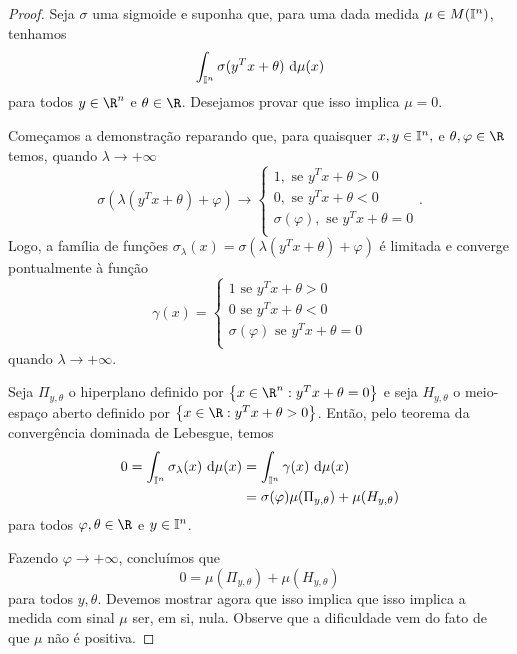 \begin{proof}
    Seja \( \sigma \) uma sigmoide e suponha que, para uma dada medida \( \mu \in M(\mathbb{I}^{ n }) \), tenhamos \[
        \int_{ \I^{ n } } \sigma(y^{ T }x + \theta) \ \mathrm{d}\mu(x)
    \]
    para todos \( y \in \R^{ n } \) e \( \theta \in \R \).
    Desejamos provar que isso implica \( \mu = 0 \).

    Começamos a demonstração reparando que, para quaisquer \( x, y \in \mathbb{I}^{ n },\) e \( \theta, \varphi \in \R \) temos, quando \( \lambda \to +\infty \) \[
        \sigma(\lambda(y^{ T }x + \theta) + \varphi)
        \to
        \begin{cases}
            1, \text{ se } y^{ T }x + \theta > 0 \\
            0, \text{ se } y^{ T }x + \theta < 0 \\
            \sigma(\varphi), \text{ se } y^{ T }x + \theta = 0 \\
        \end{cases}
    .\]
    Logo, a família de funções \( \sigma_{ \lambda }(x) = \sigma(\lambda(y^{ T }x + \theta) + \varphi) \) é limitada e converge pontualmente à função \[
        \gamma(x) =
        \begin{cases}
            1 \text{ se } y^{ T }x + \theta > 0 \\
            0 \text{ se } y^{ T }x + \theta < 0 \\
            \sigma(\varphi) \text{ se } y^{ T }x + \theta = 0 \\
        \end{cases}
    \]
    quando \( \lambda \to +\infty \).

    Seja \( \Pi_{ y, \theta } \) o hiperplano definido por \( \left\{ x \in \R^{ n } : y^{ T }x + \theta = 0 \right\} \) e seja \( H_{ y, \theta } \) o meio-espaço aberto definido por \( \left\{ x \in \R : y^{ T }x + \theta > 0 \right\} \).
    Então, pelo teorema da convergência dominada de Lebesgue, temos %
    \begin{align*}
        0 =
        \int_{ \mathbb{I}^{ n } } \sigma_{ \lambda }(x)  \ \mathrm{d}\mu(x) &= \int_{ \mathbb{I}^{ n } } \gamma(x) \ \mathrm{d}\mu(x) \\
        &= \sigma(\varphi)\mu(\Pi_{ y, \theta }) + \mu(H_{ y, \theta })
    \end{align*}
    para todos \( \varphi, \theta \in \R \) e \( y \in \mathbb{I}^{ n } \).

    Fazendo \( \varphi \to +\infty \), concluímos que \[
        0 = \mu(\Pi_{ y, \theta }) + \mu(H_{ y, \theta })
    \]
    para todos \( y, \theta \).
    Devemos mostrar agora que isso implica que isso implica a medida com sinal \( \mu \) ser, em si, nula.
    Observe que a dificuldade vem do fato de que \( \mu \) não é positiva.


\end{proof}
